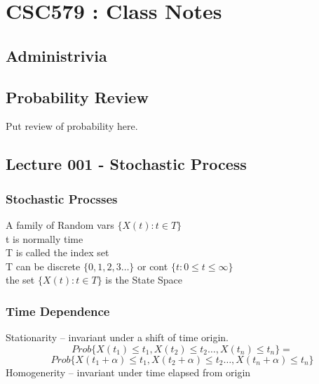 \documentclass{article}
\begin{document}
\section{CSC579 : Class Notes}
\subsection {Administrivia}
\subsection{Probability Review}
Put review of probability here. 
\subsection{ Lecture 001 - Stochastic Process}
	\subsubsection{Stochastic Procsses}
	  A family of Random vars $\{ X(t) : t\in T\}$ 
	\\\indent t is normally time  
    \\\indent T is called the index set 
    \\\indent T can be discrete $\{ 0,1,2,3 \ldots \}$ or cont $\{ t : 0 \le t \le \infty \}$
	\\\indent the set  $\{ X(t) : t \in T \}$ is the State Space 
	\\
	\subsubsection{Time Dependence}
	Stationarity -- invariant under a shift of time origin. 
	\[Prob\{ X(t_1) \le t_1, X(t_2) \le t_2 \ldots, X(t_n) \le t_n \} = \]
	\[Prob\{ X(t_1 + \alpha ) \le t_1, X(t_2 + \alpha ) \le t_2 \ldots, X(t_n +\alpha) \le t_n \}\]
	Homogenerity -- invariant under time elapsed from origin
	\\
\end{document}
